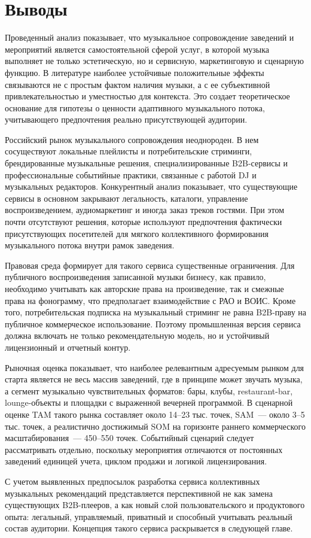 \section{Выводы}
\label{sec:market:conclusion}

Проведенный анализ показывает, что музыкальное сопровождение заведений и мероприятий является самостоятельной сферой услуг, в которой музыка выполняет не только эстетическую, но и сервисную, маркетинговую и сценарную функцию. В литературе наиболее устойчивые положительные эффекты связываются не с простым фактом наличия музыки, а с ее субъективной привлекательностью и уместностью для контекста. Это создает теоретическое основание для гипотезы о ценности адаптивного музыкального потока, учитывающего предпочтения реально присутствующей аудитории.

Российский рынок музыкального сопровождения неоднороден. В нем сосуществуют локальные плейлисты и потребительские стриминги, брендированные музыкальные решения, специализированные B2B-сервисы и профессиональные событийные практики, связанные с работой DJ и музыкальных редакторов. Конкурентный анализ показывает, что существующие сервисы в основном закрывают легальность, каталоги, управление воспроизведением, аудиомаркетинг и иногда заказ треков гостями. При этом почти отсутствуют решения, которые используют предпочтения фактически присутствующих посетителей для мягкого коллективного формирования музыкального потока внутри рамок заведения.

Правовая среда формирует для такого сервиса существенные ограничения. Для публичного воспроизведения записанной музыки бизнесу, как правило, необходимо учитывать как авторские права на произведение, так и смежные права на фонограмму, что предполагает взаимодействие с РАО и ВОИС. Кроме того, потребительская подписка на музыкальный стриминг не равна B2B-праву на публичное коммерческое использование. Поэтому промышленная версия сервиса должна включать не только рекомендательную модель, но и устойчивый лицензионный и отчетный контур.

Рыночная оценка показывает, что наиболее релевантным адресуемым рынком для старта является не весь массив заведений, где в принципе может звучать музыка, а сегмент музыкально чувствительных форматов: бары, клубы, restaurant-bar, lounge-объекты и площадки с выраженной вечерней программой. В сценарной оценке TAM такого рынка составляет около 14--23 тыс. точек, SAM~--- около 3--5 тыс. точек, а реалистично достижимый SOM на горизонте раннего коммерческого масштабирования~--- 450--550 точек. Событийный сценарий следует рассматривать отдельно, поскольку мероприятия отличаются от постоянных заведений единицей учета, циклом продажи и логикой лицензирования.

С учетом выявленных предпосылок разработка сервиса коллективных музыкальных рекомендаций представляется перспективной не как замена существующих B2B-плееров, а как новый слой пользовательского и продуктового опыта: легальный, управляемый, приватный и способный учитывать реальный состав аудитории. Концепция такого сервиса раскрывается в следующей главе.
